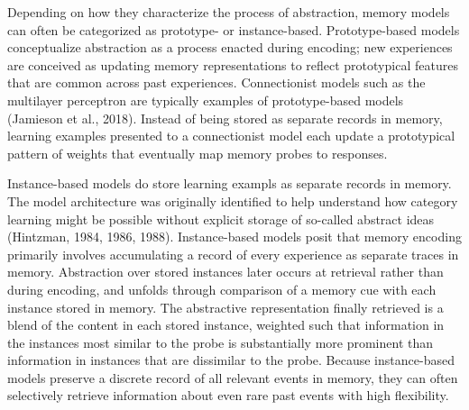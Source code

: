 \documentclass[
  letterpaper,
  DIV=11]{article}
\begin{document}
Depending on how they characterize the process of abstraction, memory
models can often be categorized as prototype- or instance-based.
Prototype-based models conceptualize abstraction as a process enacted
during encoding; new experiences are conceived as updating memory
representations to reflect prototypical features that are common across
past experiences. Connectionist models such as the multilayer perceptron
are typically examples of prototype-based models (Jamieson et al.,
2018). Instead of being stored as separate records in memory, learning
examples presented to a connectionist model each update a prototypical
pattern of weights that eventually map memory probes to responses.

Instance-based models do store learning exampls as separate records in
memory. The model architecture was originally identified to help
understand how category learning might be possible without explicit
storage of so-called abstract ideas (Hintzman, 1984, 1986, 1988).
Instance-based models posit that memory encoding primarily involves
accumulating a record of every experience as separate traces in memory.
Abstraction over stored instances later occurs at retrieval rather than
during encoding, and unfolds through comparison of a memory cue with
each instance stored in memory. The abstractive representation finally
retrieved is a blend of the content in each stored instance, weighted
such that information in the instances most similar to the probe is
substantially more prominent than information in instances that are
dissimilar to the probe. Because instance-based models preserve a
discrete record of all relevant events in memory, they can often
selectively retrieve information about even rare past events with high
flexibility.
\end{document}
